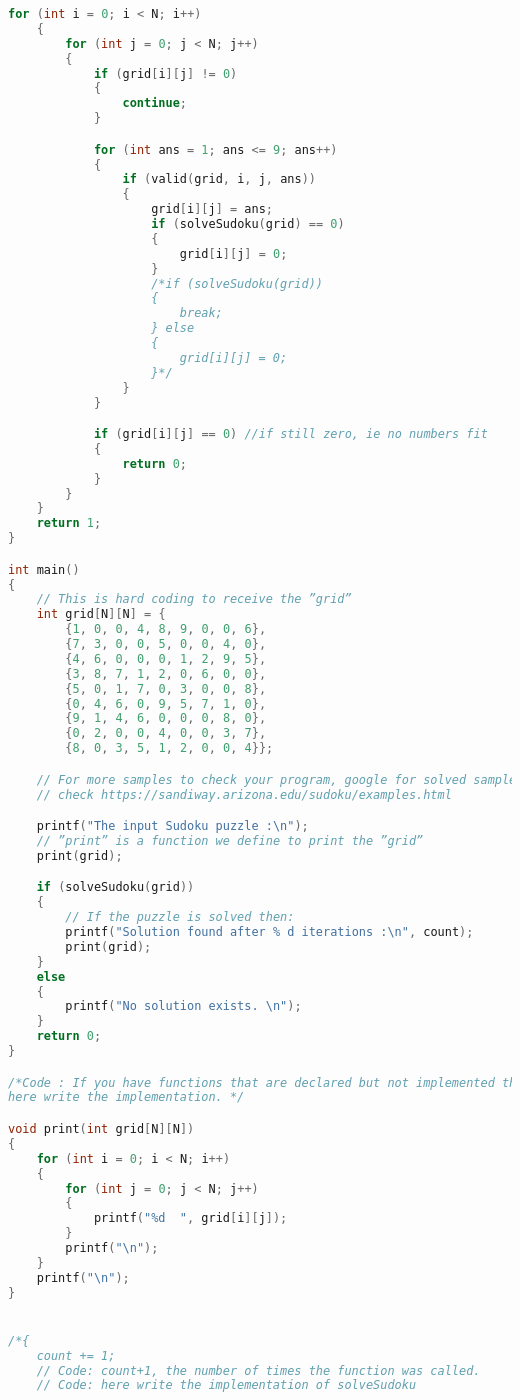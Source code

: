 \documentclass{article}
\begin{document}
\begin{lstlisting}[language=C, caption=Sudoku Solver.c]
    for (int i = 0; i < N; i++)
    {
        for (int j = 0; j < N; j++)
        {
            if (grid[i][j] != 0)
            {
                continue;
            }

            for (int ans = 1; ans <= 9; ans++)
            {
                if (valid(grid, i, j, ans))
                {
                    grid[i][j] = ans;
                    if (solveSudoku(grid) == 0)
                    {
                        grid[i][j] = 0;
                    }
                    /*if (solveSudoku(grid))
                    {
                        break;
                    } else
                    {
                        grid[i][j] = 0;
                    }*/
                }
            }

            if (grid[i][j] == 0) //if still zero, ie no numbers fit
            {
                return 0;
            }
        }
    }
    return 1;
}

int main()
{
    // This is hard coding to receive the ”grid”
    int grid[N][N] = {
        {1, 0, 0, 4, 8, 9, 0, 0, 6},
        {7, 3, 0, 0, 5, 0, 0, 4, 0},
        {4, 6, 0, 0, 0, 1, 2, 9, 5},
        {3, 8, 7, 1, 2, 0, 6, 0, 0},
        {5, 0, 1, 7, 0, 3, 0, 0, 8},
        {0, 4, 6, 0, 9, 5, 7, 1, 0},
        {9, 1, 4, 6, 0, 0, 0, 8, 0},
        {0, 2, 0, 0, 4, 0, 0, 3, 7},
        {8, 0, 3, 5, 1, 2, 0, 0, 4}};

    // For more samples to check your program, google for solved samples, or
    // check https://sandiway.arizona.edu/sudoku/examples.html

    printf("The input Sudoku puzzle :\n");
    // ”print” is a function we define to print the ”grid”
    print(grid);

    if (solveSudoku(grid))
    {
        // If the puzzle is solved then:
        printf("Solution found after % d iterations :\n", count);
        print(grid);
    }
    else
    {
        printf("No solution exists. \n");
    }
    return 0;
}

/*Code : If you have functions that are declared but not implemented they,
here write the implementation. */

void print(int grid[N][N])
{
    for (int i = 0; i < N; i++)
    {
        for (int j = 0; j < N; j++)
        {
            printf("%d  ", grid[i][j]);
        }
        printf("\n");
    }
    printf("\n");
}


/*{
    count += 1;
    // Code: count+1, the number of times the function was called.
    // Code: here write the implementation of solveSudoku


\end{lstlisting}
\end{document}
